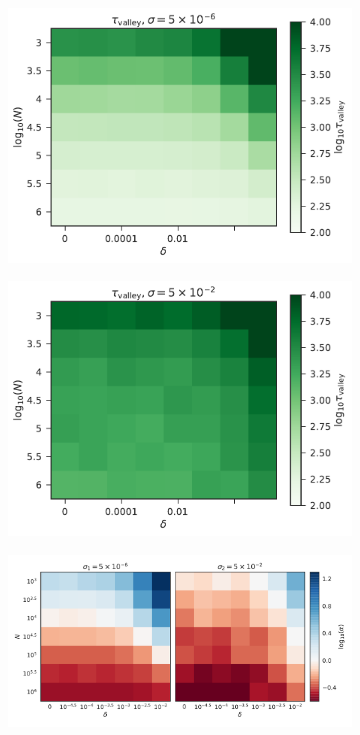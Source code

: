 \documentclass[rmp]{revtex4}
\begin{document}
\begin{figure}
\begin{subfigure}[b]{0.25\textwidth}
\includegraphics[width=\textwidth]{Figures/tau_valley_-6.pdf}
\end{subfigure}
\begin{subfigure}[b]{0.25\textwidth}
\includegraphics[width=\textwidth]{Figures/tau_valley_-2.pdf}
\end{subfigure}
\begin{subfigure}[b]{0.4\textwidth}
\includegraphics[width=\textwidth]{Figures/alpha_ratios.pdf}

\end{subfigure}
\end{figure}
\end{document}
